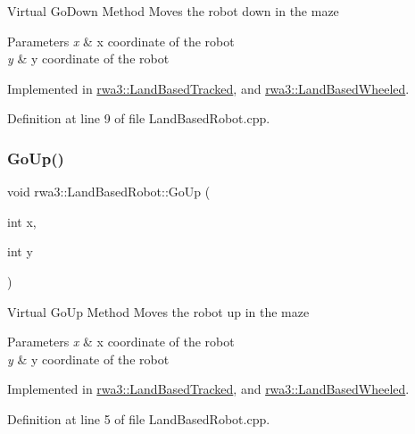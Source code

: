 Virtual Go\+Down Method Moves the robot down in the maze 
\begin{DoxyParams}{Parameters}
{\em x} & x coordinate of the robot \\
\hline
{\em y} & y coordinate of the robot \\
\hline
\end{DoxyParams}


Implemented in \hyperlink{classrwa3_1_1_land_based_tracked_a1258bb7873abc517913e84e33effd6c4}{rwa3\+::\+Land\+Based\+Tracked}, and \hyperlink{classrwa3_1_1_land_based_wheeled_a20208be52afe9cdb302f288be3bb7608}{rwa3\+::\+Land\+Based\+Wheeled}.



Definition at line 9 of file Land\+Based\+Robot.\+cpp.

\mbox{\label{classrwa3_1_1_land_based_robot_a955b0741cce58648074edff80ac1ce29}} 
\subsubsection{\texorpdfstring{Go\+Up()}{GoUp()}}
{\footnotesize\ttfamily void rwa3\+::\+Land\+Based\+Robot\+::\+Go\+Up (\begin{DoxyParamCaption}\item[{int}]{x,  }\item[{int}]{y }\end{DoxyParamCaption})\hspace{0.3cm}{\ttfamily [pure virtual]}}

Virtual Go\+Up Method Moves the robot up in the maze 
\begin{DoxyParams}{Parameters}
{\em x} & x coordinate of the robot \\
\hline
{\em y} & y coordinate of the robot \\
\hline
\end{DoxyParams}


Implemented in \hyperlink{classrwa3_1_1_land_based_tracked_a36d32a38c1c7cf44c5d7aebeb18f79ff}{rwa3\+::\+Land\+Based\+Tracked}, and \hyperlink{classrwa3_1_1_land_based_wheeled_a5feba1496039c50dd2d2f87fc286f438}{rwa3\+::\+Land\+Based\+Wheeled}.



Definition at line 5 of file Land\+Based\+Robot.\+cpp.

